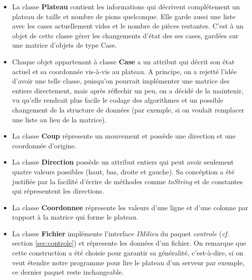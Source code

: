\documentclass{article}
\begin{document}
\begin{itemize}
  \item La classe \textbf{Plateau} contient les informations qui décrivent
  complétement un plateau de taille et nombre de pions quelconque. Elle garde
  aussi une liste avec les cases actuellement vides et le nombre de pièces
  restantes. C'est à un objet de cette classe gérer les changements d'état des
  ses cases, gardées sur une matrice d'objets de type Case.
  
  \vspace{12pt}
  
  \item Chaque objet appartenant à classe \textbf{Case} a un attribut qui
  décrit son état actuel et sa coordonnée vis-à-vis au plateau. A principe, on
  a rejetté l'idée d'avoir une telle classe, puisqu'on pourrait implémenter une
  matrice des entiers directement, mais après réflechir un peu, on a décidé de la
  maintenir, vu qu'elle rendrait plus facile le codage des algorithmes et un
  possible changement de la structure de données (par exemple, si on voulait
  remplacer une liste au lieu de la matrice).
  
  \vspace{12pt}
  
  \item La classe \textbf{Coup} répresente un mouvement et possède une direction
  et une coordonnée d'origine.
  
  \vspace{12pt}
  
  \item La classe \textbf{Direction} possède un attribut entiers qui peut avoir
  seulement quatre valeurs possibles (haut, bas, droite et gauche). Sa concéption
  a été justifiée par la facilité d'écrire de méthodes comme \textit{toString}
  et de constantes qui répresentent les directions.
  
  \vspace{12pt}
  
  \item La classe \textbf{Coordonnee} répresente les valeurs d'une ligne et d'une
  colonne par rapport à la matrice qui forme le plateau.
  
  \vspace{12pt}
  
  \item  La classe \textbf{Fichier} implémente l'interface \textit{IMilieu} du
  paquet \textit{controle} (\textit{cf.} section \ref{sec:controle}) et
  répresente les données d'un fichier. On remarque que cette construction a été
  choisie pour garantir sa généralité, c'est-à-dire, si on veut étendre notre
  programme pour lire le plateau d'un serveur par exemple, ce dernier paquet
  reste inchangeable.
  
\end{itemize}
\end{document}
